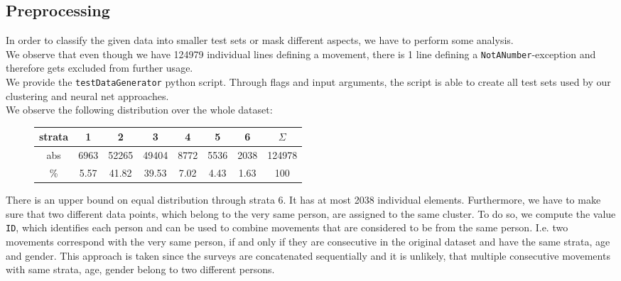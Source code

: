 \subsection{Preprocessing}\label{sec: proprocessing}
	In order to classify the given data into smaller test sets or mask different aspects, we have to perform some analysis.\\
	We observe that even though we have 124979 individual lines defining a movement, there is 1 line defining a \texttt{NotANumber}-exception and therefore gets excluded from further usage.	\\
	We provide the \texttt{testDataGenerator} python script. Through flags and input arguments, the script is able to create all test sets used by our clustering and neural net approaches.\\
	We observe the following distribution over the whole dataset:\\
	
	\vspace*{-3em}
	\begin{figure}[H]
		\centering		
		\setlength\tabcolsep{.2cm}
		\begin{tabular}{c|ccccccc}
			strata &  1   &   2   &   3   &  4   &  5   &  6   & $\Sigma$ \\ \hline
			abs   & 6963 & 52265 & 49404 & 8772 & 5536 & 2038 &  124978  \\
			\%   & 5.57 & 41.82 & 39.53 & 7.02 & 4.43 & 1.63 &   100
		\end{tabular}
		\vspace*{-2.5em}
		\label{table: distribution normal}
	\end{figure}
	There is an upper bound on equal distribution through strata 6. It has at most 2038 individual elements.
	Furthermore, we have to make sure that two different data points, which belong to the very same person, are assigned to the same cluster. To do so, we compute the value \texttt{ID}, which identifies each person and can be used to combine movements that are considered to be from the same person. I.e. two movements correspond with the very same person, if and only if they are consecutive in the original dataset and have the same strata, age and gender. This approach is taken since the surveys are concatenated sequentially and it is unlikely, that multiple consecutive movements with same strata, age, gender belong to two different persons.\\
	
